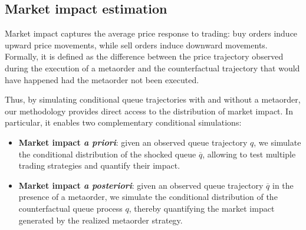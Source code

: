 \documentclass{article} %
\def\wb{\overline}
\newcommand{\1}{\mathbbm{1}} %
\begin{document}
\subsection{Market impact estimation}\label{subsec:impact_estimation}
Market impact captures the average price response to trading: buy orders induce upward price movements, while sell orders induce downward movements. 
Formally, it is defined as the difference between the price trajectory observed during the execution of a metaorder and the counterfactual trajectory that would have happened had the metaorder not been executed. 

Thus, by simulating conditional queue trajectories with and without a metaorder, our methodology provides direct access to the distribution of market impact. In particular, it enables two complementary conditional simulations:
\begin{itemize}
    \item \textbf{Market impact \textit{a priori}}: given an observed queue trajectory $q$, we simulate the conditional distribution of the shocked queue $\wb q$, allowing to test multiple trading strategies and quantify their impact.
    \item \textbf{Market impact \textit{a posteriori}}: given an observed queue trajectory $\wb q$ in the presence of a metaorder, we simulate the conditional distribution of the counterfactual queue process $q$, thereby quantifying the market impact generated by the realized metaorder strategy.
\end{itemize}
\end{document}
